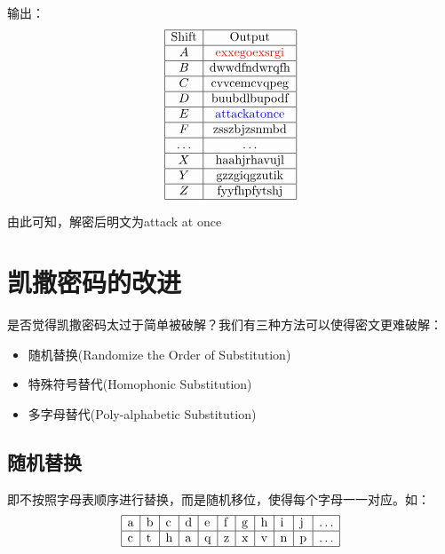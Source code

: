 \documentclass{article}
\begin{document}
输出：
$$
\begin{array}{|c|c|}
\hline \text {Shift} & \text {Output} \\
\hline A & \text {\color{red} exxegoexsrgi} \\
\hline B & \text {dwwdfndwrqfh} \\
\hline C & \text {cvvcemcvqpeg} \\
\hline D & \text {buubdlbupodf} \\
\hline E & \text {\color{blue} attackatonce} \\
\hline F & \text {zsszbjzsnmbd} \\
\hline \ldots & \ldots \\
\hline X & \text {haahjrhavujl} \\
\hline Y & \text {gzzgiqgzutik} \\
\hline Z & \text {fyyfhpfytshj} \\
\hline
\end{array}
$$

由此可知，解密后明文为attack at once\qquad\qquad\qquad\qquad\qquad\qquad\qquad\qquad\qquad\qquad \Box

\section{凯撒密码的改进}
是否觉得凯撒密码太过于简单被破解？我们有三种方法可以使得密文更难破解：
\begin{itemize}
\end{itemize}
\begin{itemize}
\item 随机替换(Randomize the Order of Substitution)
\item 特殊符号替代(Homophonic Substitution)
\item 多字母替代(Poly-alphabetic Substitution)
\end{itemize}

\subsection{随机替换}
即不按照字母表顺序进行替换，而是随机移位，使得每个字母一一对应。如：
$$
\begin{array}{|l|l|l|l|l|l|l|l|l|l|l|}
\hline \mathrm{a} & \mathrm{b} & \mathrm{c} & \mathrm{d} & \mathrm{e} & \mathrm{f} & \mathrm{g} & \mathrm{h} & \mathrm{i} & \mathrm{j} & \ldots \\
\hline \mathrm{c} & \mathrm{t} & \mathrm{h} & \mathrm{a} & \mathrm{q} & \mathrm{z} & \mathrm{x} & \mathrm{v} & \mathrm{n} & \mathrm{p} & \ldots \\
\hline
\end{array}
$$	
\end{document}
